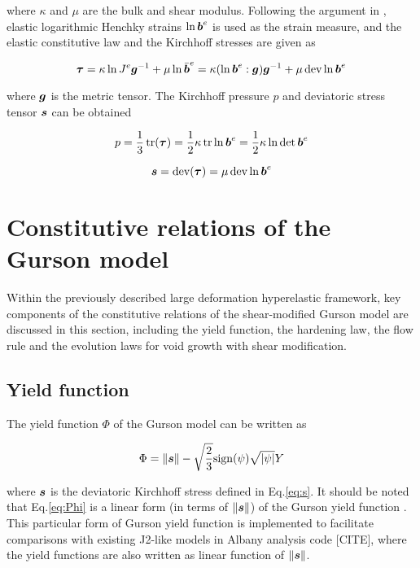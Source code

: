 where $\kappa$ and $\mu$ are the bulk and shear modulus. Following the argument in \cite{Steinmann1994}, elastic logarithmic Henchky strains $\ln{\boldsymbol{b}}^e$ is used as the strain measure, and the elastic constitutive law and the Kirchhoff stresses are given as

\begin{equation}\label{eq:Kirchhoff}
{\boldsymbol{\tau}}=\kappa\ln J^e{\boldsymbol{g}}^{-1} + \mu\ln\bar{{\boldsymbol{b}}}^e = \kappa(\ln{\boldsymbol{b}}^e:{\boldsymbol{g}}){\boldsymbol{g}}^{-1} + \mu\operatorname{\text{dev}}\ln{\boldsymbol{b}}^e
\end{equation}

where ${\boldsymbol{g}}$ is the metric tensor. The Kirchhoff pressure $p$ and deviatoric stress tensor ${\boldsymbol{s}}$ can be obtained

\begin{equation}\label{eq:p}
p = \frac{1}{3}\operatorname{\text{tr}}({\boldsymbol{\tau}}) = \frac{1}{2}\kappa\operatorname{\text{tr}}\ln{\boldsymbol{b}}^e = \frac{1}{2}\kappa\ln\det{\boldsymbol{b}}^e
\end{equation}

\begin{equation}\label{eq:s}
{\boldsymbol{s}} = \operatorname{\text{dev}}({\boldsymbol{\tau}}) = \mu\operatorname{\text{dev}}\ln{\boldsymbol{b}}^e
\end{equation}

\section{Constitutive relations of the Gurson model}
Within the previously described large deformation hyperelastic framework, key components of the constitutive relations of the shear-modified Gurson model are discussed in this section, including the yield function, the hardening law, the flow rule and the evolution laws for void growth with shear modification.

\subsection{Yield function}

The yield function $\Phi$ of the Gurson model can be written as

\begin{equation}\label{eq:Phi}
\Phi = \|{\boldsymbol{s}}\| - \sqrt{\frac{2}{3}}{\rm sign}(\psi)\sqrt{|\psi|} Y
\end{equation}

where ${\boldsymbol{s}}$ is the deviatoric Kirchhoff stress defined in Eq.\eqref{eq:s}. It should be noted that Eq.\eqref{eq:Phi} is a linear form (in terms of $\|{\boldsymbol{s}}\|$) of the Gurson yield function . This particular form of Gurson yield function is implemented to facilitate comparisons with existing J2-like models in Albany analysis code [CITE], where the yield functions are also written as linear function of $\|{\boldsymbol{s}}\|$. 

